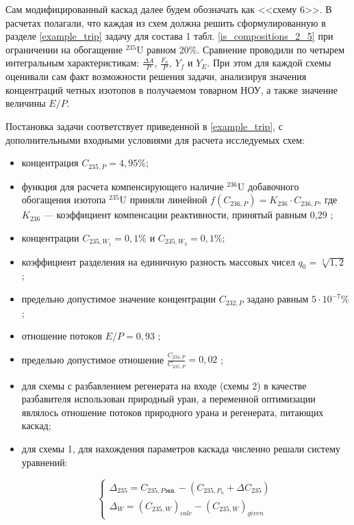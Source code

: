 Сам модифицированный каскад далее будем обозначать как <<схему 6>>. В расчетах полагали, что каждая из схем должна решить сформулированную в разделе \ref{example_trip} задачу для состава 1 табл. \ref{is_compositions_2_5} при ограничении на обогащение $^{235}$U равном 20\%. Сравнение проводили по четырем интегральным характеристикам: $\frac{\Delta A}{P}$, $\frac{F_n}{P}$, $Y_f$ и $Y_E$. При этом для каждой схемы оценивали сам факт возможности решения задачи, анализируя значения концентраций четных изотопов в получаемом товарном НОУ, а также значение величины $E/P$. 

Постановка задачи соответствует приведенной в \ref{example_trip}, с дополнительными входными условиями для расчета исследуемых схем:

\begin{itemize}
    \item концентрация $C_{235,{P}} = {4,95\%}$; 
    \item функция для расчета компенсирующего наличие $^{236}$U добавочного обогащения изотопа $^{235}$U приняли линейной $f(C_{236,P}) = {K_{236}\cdot{C_{236,{P}}}}$, где $K_{236}$ --- коэффициент компенсации реактивности, принятый равным 0,29 \cite{smirnovEvolutionIsotopicComposition2012};
    \item концентрации $C_{235,{W_1}} = 0,1\%$ и $C_{235,{W_3}} = 0,1\%$;
    \item коэффициент разделения на единичную разность массовых чисел $q_{0} = \sqrt[3]{1,2}$ \cite{smirnovEvolutionIsotopicComposition2012};
    \item предельно допустимое значение концентрации $C_{232,{P}}$ задано равным $5\cdot10^{-7} \%$;
    \item отношение потоков $E/P = 0,93$ \cite{smirnovObogashchenieRegenerirovannogoUrana2018};
    \item предельно допустимое отношение $\frac{C_{234,{P}}}{C_{235,{P}}} = 0,02$ \cite{smirnovObogashchenieRegenerirovannogoUrana2018};
    \item для схемы с разбавлением регенерата на входе (схемы 2) в качестве разбавителя использован природный уран, а переменной оптимизации являлось отношение потоков природного урана и регенерата, питающих каскад;
    \item для схемы 1, для нахождения параметров каскада численно решали систему уравнений:
    
    \begin{equation}\label{snau_sch1}
  \begin{cases}
  \Delta_{235}=C_{235,P\textit{экв.}}-(C_{235,{P_n}}+\Delta C_{235})\\
  \Delta_{W} = {(C_{235, W})}_{calc}-{(C_{235, W})}_{given}
  \end{cases}\,
\end{equation}
    

\end{itemize}
